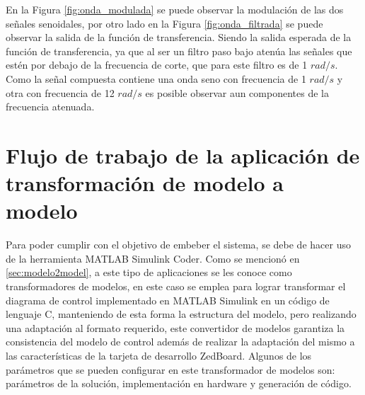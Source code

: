 En la Figura \ref{fig:onda_modulada} se puede observar la modulación de las dos señales senoidales, por otro lado en la Figura \ref{fig:onda_filtrada} se puede observar la salida de la función de transferencia. Siendo la salida esperada de la función de transferencia, ya que al ser un filtro paso bajo atenúa las señales que estén por debajo de la frecuencia de corte, que para este filtro es de 1 $rad/s$. Como la señal compuesta contiene una onda seno con frecuencia de 1 $rad/s$ y otra con frecuencia de 12 $rad/s$ es posible observar aun componentes de la frecuencia atenuada.

\section{Flujo de trabajo de la aplicación de transformación de modelo a modelo}

Para poder cumplir con el objetivo de embeber el sistema, se debe de hacer uso de la herramienta MATLAB Simulink Coder. Como se mencionó en \ref{sec:modelo2model}, a este tipo de aplicaciones se les conoce como transformadores de modelos, en este caso se emplea para lograr transformar el diagrama de control implementado en MATLAB Simulink en un código de lenguaje C, manteniendo de esta forma la estructura del modelo, pero realizando una adaptación al formato requerido, este convertidor de modelos garantiza la consistencia del modelo de control además de realizar la adaptación del mismo a las características de la tarjeta de desarrollo ZedBoard. Algunos de los parámetros que se pueden configurar en este transformador de modelos son: parámetros de la solución, implementación en hardware y generación de código.
\newpage

